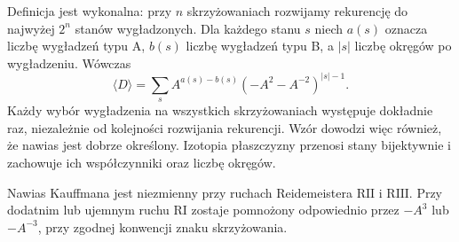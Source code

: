 \begin{center}
\end{center}

Definicja jest wykonalna: przy $n$ skrzyżowaniach rozwijamy
rekurencję do najwyżej $2^n$ stanów wygładzonych. Dla każdego
stanu $s$ niech $a(s)$ oznacza liczbę wygładzeń typu A,
$b(s)$ liczbę wygładzeń typu B, a $|s|$ liczbę okręgów po
wygładzeniu. Wówczas
\[
\langle D\rangle=\sum_s A^{a(s)-b(s)}
(-A^2-A^{-2})^{|s|-1}.
\]
Każdy wybór wygładzenia na wszystkich skrzyżowaniach
występuje dokładnie raz, niezależnie od kolejności
rozwijania rekurencji. Wzór dowodzi więc również, że
nawias jest dobrze określony. Izotopia płaszczyzny
przenosi stany bijektywnie i zachowuje ich współczynniki
oraz liczbę okręgów.

\begin{stwierdzenie}
Nawias Kauffmana jest niezmienny przy ruchach Reidemeistera
$\mathrm{R II}$ i $\mathrm{R III}$. Przy dodatnim lub ujemnym
ruchu $\mathrm{R I}$ zostaje pomnożony odpowiednio przez
$-A^3$ lub $-A^{-3}$, przy zgodnej konwencji znaku skrzyżowania.
\end{stwierdzenie}


